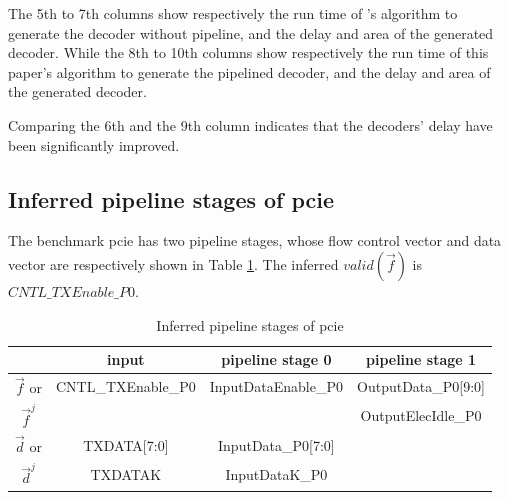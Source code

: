 \documentclass[conference]{IEEEtran}
\begin{document}
The 5th to 7th columns show respectively the run time of \cite{ShenTCAD11}'s algorithm to generate the decoder without pipeline,
and the delay and area of the generated decoder.
While the 8th to 10th columns show respectively the run time of this paper's algorithm to generate the pipelined decoder,
and the delay and area of the generated decoder.

Comparing the 6th and the 9th column indicates that
the decoders' delay have been significantly improved.


\subsection{Inferred pipeline stages of pcie}

The benchmark pcie has two pipeline stages,
whose flow control vector and data vector are respectively shown in Table \ref{tab_pcie}.
The inferred $valid(\vec{f})$ is $CNTL\_TXEnable\_P0$.

\begin{table}[t]
\centering
\caption{Inferred pipeline stages of pcie}
\begin{tabular}{|c|c|c|c|}
\hline
                       & input                  & pipeline stage 0          &  pipeline stage 1    \\\hline\hline
$\vec{f}$ or           &CNTL\_TXEnable\_P0      & InputDataEnable\_P0       & OutputData\_P0[9:0]\\
$\vec{f}^j$            &                        &                           & OutputElecIdle\_P0 \\\hline
$\vec{d}$ or           &TXDATA[7:0]             & InputData\_P0[7:0]        & \\
$\vec{d}^j$              &TXDATAK                 & InputDataK\_P0            & \\\hline
\end{tabular}\label{tab_pcie}
\end{table}
\end{document}
